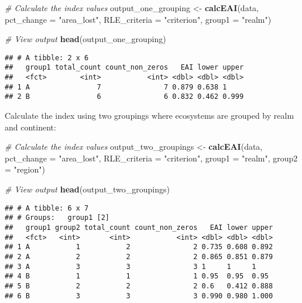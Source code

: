 \documentclass[]{article}
\newenvironment{Shaded}{\begin{snugshade}}{\end{snugshade}}
\newcommand{\KeywordTok}[1]{\textcolor[rgb]{0.13,0.29,0.53}{\textbf{#1}}}
\newcommand{\DataTypeTok}[1]{\textcolor[rgb]{0.13,0.29,0.53}{#1}}
\newcommand{\StringTok}[1]{\textcolor[rgb]{0.31,0.60,0.02}{#1}}
\newcommand{\CommentTok}[1]{\textcolor[rgb]{0.56,0.35,0.01}{\textit{#1}}}
\newcommand{\NormalTok}[1]{#1}
\begin{document}
\begin{Shaded}
\begin{Highlighting}[]
\CommentTok{# Calculate the index values}
\NormalTok{output_one_grouping <-}\StringTok{ }\KeywordTok{calcEAI}\NormalTok{(data,}
                               \DataTypeTok{pct_change =} \StringTok{"area_lost"}\NormalTok{,}
                               \DataTypeTok{RLE_criteria =} \StringTok{"criterion"}\NormalTok{,}
                               \DataTypeTok{group1 =} \StringTok{"realm"}\NormalTok{)}

\CommentTok{# View output}
\KeywordTok{head}\NormalTok{(output_one_grouping)}
\end{Highlighting}
\end{Shaded}

\begin{verbatim}
## # A tibble: 2 x 6
##   group1 total_count count_non_zeros   EAI lower upper
##   <fct>        <int>           <int> <dbl> <dbl> <dbl>
## 1 A                7               7 0.879 0.638 1    
## 2 B                6               6 0.832 0.462 0.999
\end{verbatim}

Calculate the index using two groupings where ecosystems are grouped by
realm and continent:

\begin{Shaded}
\begin{Highlighting}[]
\CommentTok{# Calculate the index values}
\NormalTok{output_two_groupings <-}\StringTok{ }\KeywordTok{calcEAI}\NormalTok{(data,}
                                \DataTypeTok{pct_change =} \StringTok{"area_lost"}\NormalTok{,}
                                \DataTypeTok{RLE_criteria =} \StringTok{"criterion"}\NormalTok{,}
                                \DataTypeTok{group1 =} \StringTok{"realm"}\NormalTok{,}
                                \DataTypeTok{group2 =} \StringTok{"region"}\NormalTok{)}

\CommentTok{# View output}
\KeywordTok{head}\NormalTok{(output_two_groupings)}
\end{Highlighting}
\end{Shaded}

\begin{verbatim}
## # A tibble: 6 x 7
## # Groups:   group1 [2]
##   group1 group2 total_count count_non_zeros   EAI lower upper
##   <fct>   <int>       <int>           <int> <dbl> <dbl> <dbl>
## 1 A           1           2               2 0.735 0.608 0.892
## 2 A           2           2               2 0.865 0.851 0.879
## 3 A           3           3               3 1     1     1    
## 4 B           1           1               1 0.95  0.95  0.95 
## 5 B           2           2               2 0.6   0.412 0.888
## 6 B           3           3               3 0.990 0.980 1.000
\end{verbatim}
\end{document}
